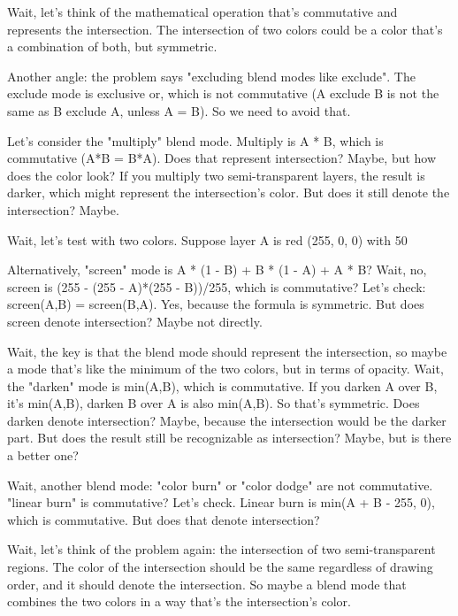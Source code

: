 Wait, let's think of the mathematical operation that's commutative and represents the intersection. The intersection of two colors could be a color that's a combination of both, but symmetric. 

Another angle: the problem says "excluding blend modes like exclude". The exclude mode is exclusive or, which is not commutative (A exclude B is not the same as B exclude A, unless A = B). So we need to avoid that. 

Let's consider the "multiply" blend mode. Multiply is A * B, which is commutative (A*B = B*A). Does that represent intersection? Maybe, but how does the color look? If you multiply two semi-transparent layers, the result is darker, which might represent the intersection's color. But does it still denote the intersection? Maybe. 

Wait, let's test with two colors. Suppose layer A is red (255, 0, 0) with 50%

Alternatively, "screen" mode is A * (1 - B) + B * (1 - A) + A * B? Wait, no, screen is (255 - (255 - A)*(255 - B))/255, which is commutative? Let's check: screen(A,B) = screen(B,A). Yes, because the formula is symmetric. But does screen denote intersection? Maybe not directly. 

Wait, the key is that the blend mode should represent the intersection, so maybe a mode that's like the minimum of the two colors, but in terms of opacity. Wait, the "darken" mode is min(A,B), which is commutative. If you darken A over B, it's min(A,B), darken B over A is also min(A,B). So that's symmetric. Does darken denote intersection? Maybe, because the intersection would be the darker part. But does the result still be recognizable as intersection? Maybe, but is there a better one? 

Wait, another blend mode: "color burn" or "color dodge" are not commutative. "linear burn" is commutative? Let's check. Linear burn is min(A + B - 255, 0), which is commutative. But does that denote intersection? 

Wait, let's think of the problem again: the intersection of two semi-transparent regions. The color of the intersection should be the same regardless of drawing order, and it should denote the intersection. So maybe a blend mode that combines the two colors in a way that's the intersection's color. 


